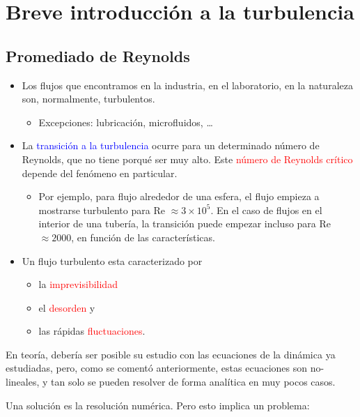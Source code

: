 \chapter[Turbulencia]{Breve introducción a la turbulencia}\label{Turbulencia}
\section{Promediado de Reynolds}

	
	\begin{itemize}
		\item Los flujos que encontramos en la industria, en el laboratorio, en
		la naturaleza son, normalmente, turbulentos.
		
		\begin{itemize}
			\item Excepciones: lubricación, microfluidos, \ldots{}
		\end{itemize}
		\item La \textcolor{blue}{transición a la turbulencia} ocurre para un determinado
		número de Reynolds, que no tiene porqué ser muy alto. Este \textcolor{red}{número
			de Reynolds crítico} depende del fenómeno en particular. 
		
		\begin{itemize}
			\item Por ejemplo, para flujo alrededor de una esfera, el flujo empieza
			a mostrarse turbulento para Re $\approx3\times10^{5}$. En el caso
			de flujos en el interior de una tubería, la transición puede empezar
			incluso para Re $\approx2000$, en función de las características.
		\end{itemize}
		\item Un flujo turbulento esta caracterizado por 
		
		\begin{itemize}
			\item la \textcolor{red}{imprevisibilidad}
			\item el \textcolor{red}{desorden} y 
			\item las rápidas \textcolor{red}{fluctuaciones}. 
		\end{itemize}
	\end{itemize}

	
	En teoría, debería ser posible su estudio con las ecuaciones de la
	dinámica ya estudiadas, pero, como se comentó anteriormente, estas
	ecuaciones son no-lineales, y tan solo se pueden resolver de forma
	analítica en muy pocos casos.
	
	Una solución es la resolución numérica. Pero esto implica un problema:
	
